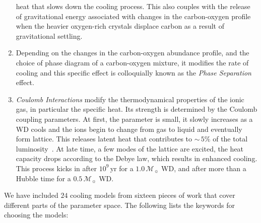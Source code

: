 \documentclass[fleqn,usenatbib]{rasti}
\newcommand{\msun}{\mathcal{M}_{\sun}}
\begin{document}
\begin{enumerate}
heat that slows down the cooling process. This also couples with the release
of gravitational energy associated with changes in the carbon-oxygen
profile~\citep{1997ApJ...486..413S} when the heavier oxygen-rich crystals
displace carbon as a result of gravitational settling.
    \item Depending on the
changes in the carbon-oxygen abundance profile, and the choice of phase
diagram of a carbon-oxygen mixture, it modifies the rate of cooling and this
specific effect is colloquially known as the \textit{Phase Separation}
effect.
    \item \textit{Coulomb Interactions} modify the thermodynamical
properties of the ionic gas, in particular the specific heat. Its strength is
determined by the Coulomb coupling parameters. At first, the parameter is
small, it slowly increases as a WD cools and the ions begin to change from
gas to liquid and eventually form lattice. This releases latent heat that
contributes to $\sim$\,$5\%$ of the total luminosity~\citep{1976A&A....51..383S}.
At late time, a few modes of the lattice are excited, the heat capacity drops
according to the Debye law, which results in enhanced cooling. This process
kicks in after $10^9$\,yr for a $1.0\,\msun$ WD, and after more than a Hubble time for a
$0.5\,\msun$ WD.
\end{enumerate}

We have included $24$ cooling models from sixteen pieces of work
that cover different parts of the parameter space. The following lists the
keywords for choosing the models:
\end{document}
